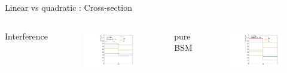 \begin{frame}{Linear vs quadratic : Cross-section}
\begin{columns}

Interference
\begin{figure}
    \centering
    \includegraphics[width=1.\textwidth]{Part5/Img/a_i_total.pdf}
\end{figure}
    

pure BSM
\begin{figure}
    \centering
    \includegraphics[width=1.\textwidth]{BackUp/Part5/Img/a_i_total_Quad.pdf}
\end{figure}

\end{columns}
\end{frame}

